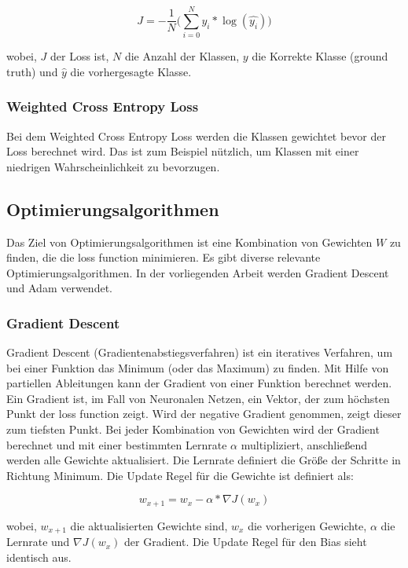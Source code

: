 \begin{equation}
  J = -\frac{1}{N} \Big(\sum_{i=0}^N y_{i} * \log(\hat{y_{i}})\Big)
\end{equation}

wobei, $J$ der Loss ist, $N$ die Anzahl der Klassen, $y$ die Korrekte Klasse (\gls{ground truth}) und $ \hat{y}$ die vorhergesagte Klasse.

\subsubsection{Weighted Cross Entropy Loss}
Bei dem Weighted Cross Entropy Loss werden die Klassen gewichtet bevor der Loss berechnet wird. Das ist zum Beispiel nützlich, um Klassen  
mit einer niedrigen Wahrscheinlichkeit zu bevorzugen.

\subsection{Optimierungsalgorithmen}
Das Ziel von Optimierungsalgorithmen ist eine Kombination von Gewichten $ W $ zu finden, die die \gls{loss function} minimieren.
Es gibt diverse relevante Optimierungsalgorithmen. In der vorliegenden Arbeit werden Gradient Descent und Adam verwendet.

\subsubsection{Gradient Descent}
Gradient Descent (Gradientenabstiegsverfahren) ist ein iteratives Verfahren, um bei einer Funktion das Minimum (oder das Maximum) zu finden. 
Mit Hilfe von partiellen Ableitungen kann der Gradient von einer Funktion berechnet werden. Ein Gradient ist, im Fall von Neuronalen
Netzen, ein Vektor, der zum höchsten Punkt der \gls{loss function} zeigt. Wird der negative Gradient genommen, zeigt dieser zum tiefsten Punkt.
Bei jeder Kombination von Gewichten wird der Gradient berechnet und mit einer bestimmten Lernrate $ \alpha $ multipliziert, anschließend werden 
alle Gewichte aktualisiert. Die Lernrate definiert die Größe der Schritte in Richtung Minimum. Die Update Regel für die Gewichte ist definiert als:

\begin{equation}
  w_{x+1} = w_x - \alpha * \nabla J(w_x)
\end{equation}

wobei, $w_{x+1}$ die aktualisierten Gewichte sind, $w_x$ die vorherigen Gewichte, $ \alpha $ die Lernrate und $\nabla J(w_x)$ der Gradient. 
Die Update Regel für den Bias sieht identisch aus.

